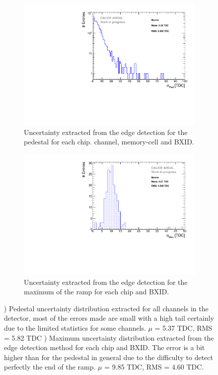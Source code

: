 \begin{figure}[thtbp!]
	\begin{subfigure}[t]{0.49\textwidth}
		\centering
		\includegraphics[width=1\linewidth]{../Thesis_Plots/Timing/Muons/Plots/PedestalErrorDistribution_AHCAL.pdf}
		\caption{Uncertainty extracted from the edge detection for the pedestal for each chip. channel, memory-cell and BXID.} \label{fig:error_ped}
	\end{subfigure}
	\hfill
	\begin{subfigure}[t]{0.49\textwidth}
		\centering
		\includegraphics[width=1\linewidth]{../Thesis_Plots/Timing/Muons/Plots/MaxErrorDistribution_AHCAL.pdf}
		\caption{Uncertainty extracted from the edge detection for the maximum of the ramp for each chip and BXID.} \label{fig:error_max}
	\end{subfigure}
	\caption{) Pedestal uncertainty distribution extracted for all channels in the detector, most of the errors made are small with a high tail certainly due to the limited statistics for some channels. $\mu$ = 5.37 TDC, RMS = 5.82 TDC ) Maximum uncertainty distribution extracted from the edge detection method for each chip and BXID. The error is a bit higher than for the pedestal in general due to the difficulty to detect perfectly the end of the ramp. $\mu$ = 9.85 TDC, RMS = 4.60 TDC.}
\end{figure}

